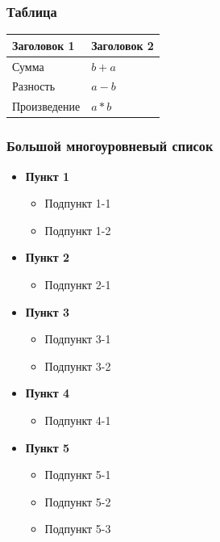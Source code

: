 \documentclass[14pt]{beamer}
\newcommand{\itemi}{\item[\checkmark]}
\begin{document}
\begin{frame}
\begin{figure}[h]
\begin{minipage}[h]{0.49\linewidth}
  \end{minipage}
\end{figure}
\end{frame}

\begin{frame}
\frametitle{Таблица}
\begin{tabular}{|l|l|}
\hline
\textbf{Заголовок 1} & \textbf{Заголовок 2} \\
\hline
Сумма & $b+a$ \\
\hline
Разность & $a-b$ \\
\hline
Произведение & $a*b$ \\
\hline
\end{tabular}
\end{frame}

\begin{frame}
\frametitle{Большой многоуровневый список}
\begin{itemize}
  \item \textbf{Пункт 1}
    \begin{itemize}
      \itemi Подпункт 1-1
      \itemi Подпункт 1-2
    \end{itemize}
  \item \textbf{Пункт 2}
    \begin{itemize}
      \itemi Подпункт 2-1
    \end{itemize}
  \item \textbf{Пункт 3}
    \begin{itemize}
      \itemi Подпункт 3-1
      \itemi Подпункт 3-2
    \end{itemize}
  \item \textbf{Пункт 4}
    \begin{itemize}
      \itemi Подпункт 4-1
    \end{itemize}
  \item \textbf{Пункт 5}
    \begin{itemize}
      \itemi Подпункт 5-1
      \itemi Подпункт 5-2
      \itemi Подпункт 5-3
    \end{itemize}
\end{itemize}
\end{frame}
\end{document}
